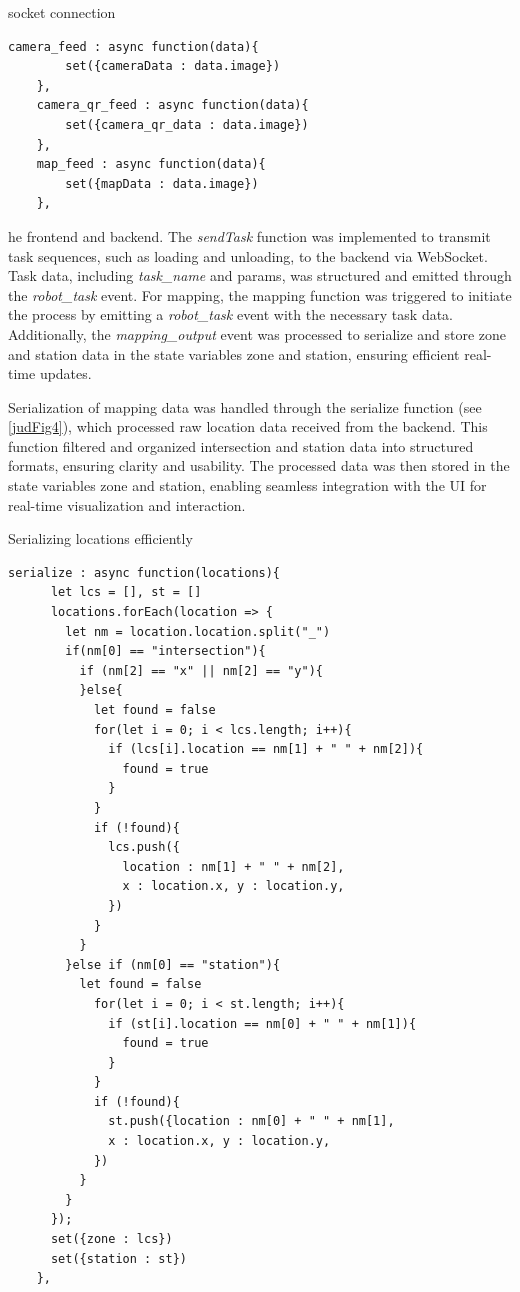 \documentclass[../../main]{subfiles}
\begin{document}
\begin{codebox}[]{socket connection}
  \begin{verbatim}
camera_feed : async function(data){
        set({cameraData : data.image})
    },
    camera_qr_feed : async function(data){
        set({camera_qr_data : data.image})
    },
    map_feed : async function(data){
        set({mapData : data.image})
    },
\end{verbatim}
\end{codebox}
he frontend and backend. The \emph{sendTask} function was
implemented to transmit task sequences, such as loading and unloading,
to the backend via WebSocket. Task data, including \emph{task\_name} and
params, was structured and emitted through the \emph{robot\_task} event.
For mapping, the mapping function was triggered to initiate the process
by emitting a \emph{robot\_task} event with the necessary task data.
Additionally, the \emph{mapping\_output} event was processed to
serialize and store zone and station data in the state variables zone
and station, ensuring efficient real-time updates.

Serialization of mapping data was handled through the serialize function
(see \cref{judFig4}), which processed raw location data received from the
backend. This function filtered and organized intersection and station
data into structured formats, ensuring clarity and usability. The
processed data was then stored in the state variables zone and station,
enabling seamless integration with the UI for real-time visualization
and interaction.

\begin{codebox}[]{Serializing locations efficiently}
  \begin{verbatim}
serialize : async function(locations){
      let lcs = [], st = []
      locations.forEach(location => {
        let nm = location.location.split("_")
        if(nm[0] == "intersection"){
          if (nm[2] == "x" || nm[2] == "y"){ 
          }else{
            let found = false
            for(let i = 0; i < lcs.length; i++){
              if (lcs[i].location == nm[1] + " " + nm[2]){
                found = true
              }
            }
            if (!found){
              lcs.push({
                location : nm[1] + " " + nm[2],
                x : location.x, y : location.y,
              })
            }
          }
        }else if (nm[0] == "station"){
          let found = false
            for(let i = 0; i < st.length; i++){
              if (st[i].location == nm[0] + " " + nm[1]){
                found = true
              }
            }
            if (!found){
              st.push({location : nm[0] + " " + nm[1],
              x : location.x, y : location.y,
            })
          }
        }
      });
      set({zone : lcs})
      set({station : st})
    },
\end{verbatim}
\end{codebox}
\end{document}
